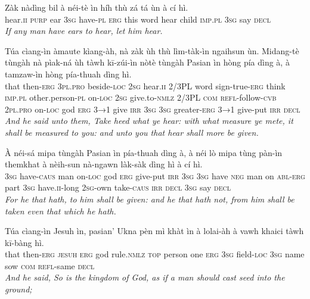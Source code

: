 \documentclass[11pt,a4paper]{article}
\begin{document}
\begin{exe}
\gll Zàk nàdìng bil à néi-tè ìn híh thù zá tá ùn à cí hì. \\
     hear.\textsc{ii} \textsc{purp} ear \textsc{3sg} have-\textsc{pl} \textsc{erg} this word hear child \textsc{imp}.\textsc{pl} \textsc{3sg} say \textsc{decl} \\
\glt \textcolor{kjvcolor}{\textit{If any man have ears to hear, let him hear.}}

\gll Túa cìang-ìn àmaute kìang-àh, nà zàk ùh thù lìm-tàk-ìn ngaihsun ùn. Midang-tè tùngàh nà pìak-ná ùh tàwh kī-zúi-ìn nòtè tùngàh Pasian ìn hòng pía dìng à, à tamzaw-ìn hòng pía-thuah dìng hì. \\
     that then-\textsc{erg} \textsc{3pl}.\textsc{pro} beside-\textsc{loc} \textsc{2sg} hear.\textsc{ii} 2/3PL word sign-true-\textsc{erg} think \textsc{imp}.\textsc{pl} other.person-\textsc{pl} on-\textsc{loc} \textsc{2sg} give.to-\textsc{nmlz} 2/3PL \textsc{com} \textsc{refl}-follow-\textsc{cvb} \textsc{2pl}.\textsc{pro} on-\textsc{loc} god \textsc{erg} \textsc{3→1} give \textsc{irr} \textsc{3sg} \textsc{3sg} greater-\textsc{erg} \textsc{3→1} give-put \textsc{irr} \textsc{decl} \\
\glt \textcolor{kjvcolor}{\textit{And he said unto them, Take heed what ye hear: with what measure ye mete, it shall be measured to you: and unto you that hear shall more be given.}}

\gll À néi-sá mipa tùngàh Pasian ìn pía-thuah dìng à, à néi lò mipa tùng pàn-ìn themkhat à nèih-sun nà-ngawn làk-sàk dìng hì à cí hì. \\
     \textsc{3sg} have-\textsc{caus} man on-\textsc{loc} god \textsc{erg} give-put \textsc{irr} \textsc{3sg} \textsc{3sg} have \textsc{neg} man on \textsc{abl}-\textsc{erg} part \textsc{3sg} have.\textsc{ii}-long \textsc{2sg}-own take-\textsc{caus} \textsc{irr} \textsc{decl} \textsc{3sg} say \textsc{decl} \\
\glt \textcolor{kjvcolor}{\textit{For he that hath, to him shall be given: and he that hath not, from him shall be taken even that which he hath.}}

\gll Túa cìang-ìn Jesuh ìn, pasian' Ukna pèn mì khàt ìn à lolai-àh à vawh khaici tàwh kī-bàng hì. \\
     that then-\textsc{erg} \textsc{jesuh} \textsc{erg} god rule.\textsc{nmlz} \textsc{top} person one \textsc{erg} \textsc{3sg} field-\textsc{loc} \textsc{3sg} name sow \textsc{com} \textsc{refl}-same \textsc{decl} \\
\glt \textcolor{kjvcolor}{\textit{And he said, So is the kingdom of God, as if a man should cast seed into the ground;}}


\end{exe}
\end{document}
